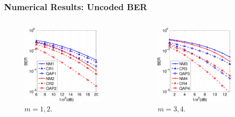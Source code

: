 \documentclass{beamer}
\begin{document}
\begin{frame}
  \frametitle{Numerical Results: Uncoded BER}
  \begin{columns}
    \begin{figure}
      \includegraphics[width=0.9\textwidth]{figs/BER_noise_power_MonteCarlo_64QAM_23.pdf}
      \caption{$m=1,2$.}
    \end{figure}
    
    \begin{figure}
      \includegraphics[width=0.9\textwidth]{figs/BER_noise_power_MonteCarlo_64QAM_45.pdf}
      \caption{$m=3,4$.}
    \end{figure}
  \end{columns}
\end{frame}
\end{document}
